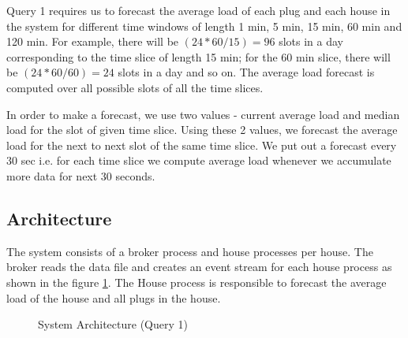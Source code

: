 Query 1 requires us to forecast the average load of each plug and each house in the system for different time windows of length 1 min, 5 min, 15 min, 60 min and 120 min. For example, there will be $(24*60/15) = 96$ slots in a day corresponding to the time slice of length 15 min; for the 60 min slice, there will be $(24*60/60) = 24$ slots in a day and so on. The average load forecast is computed over all possible slots of all the time slices.

In order to make a forecast, we use two values - current average load and median load for the slot of given time slice. Using these 2 values, we forecast the average load for the next to next slot of the same time slice. We put out a forecast every 30 sec i.e. for each time slice we compute average load whenever we accumulate more data for next 30 seconds.

\subsection{Architecture}
The system consists of a broker process and house processes per house. The broker reads the data file and creates an event stream for each house process as shown in the figure \ref{fig:sysarch1}. The House process is responsible to forecast the average load of the house and all plugs in the house.

\begin{figure}[h]
\begin{center}
\caption{System Architecture (Query 1)}
\end{center}
\label{fig:sysarch1}
\end{figure}

